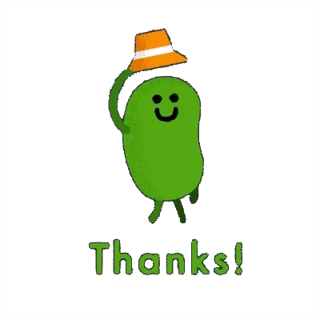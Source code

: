\documentclass{beamer}
\begin{document}
    \begin{frame}
        \begin{center}
            \includegraphics{thanks.png}
        \end{center}
    \end{frame}
\end{document}
